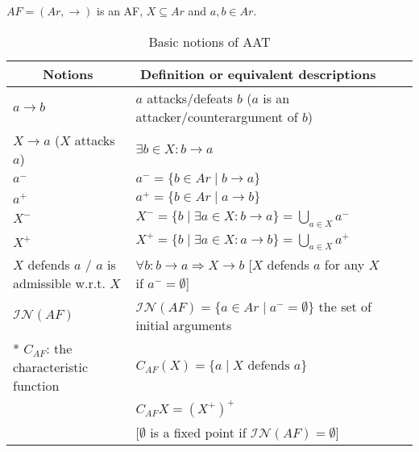 \begin{table}[ht!]
    \centering
    \caption{Basic notions of AAT}
    \label{tab: basic notions of AAT}
    $AF = (Ar,\to)$ is an AF, $X \subseteq Ar$ and $a,b \in Ar$.
    \vspace{1em}

    \renewcommand{\arraystretch}{1.3}
    \begin{tabular}{l||lll}
    \hline
    \multicolumn{1}{c}{Notions}  & 
    \multicolumn{1}{c}{Definition or equivalent descriptions} \\
    \hline

    $a \to b$   &
    $a$ attacks/defeats $b$ \hfill  ($a$ is an attacker/counterargument of $b$)   \\

    $X \to a$ \qquad  ($X$ attacks $a$) & 
    $\exists b \in X: b \to a$  \\

    
    
    $a^-$ &  
    $a^- = \{b \in Ar \mid b \to a\}$  \\

    $a^+$ &  
    $a^+ = \{b \in Ar \mid a \to b\}$  \\

    $X^-$ &  
    $X^- = \{b \mid \exists a \in X: b \to a\} = \bigcup_{a\in X} a^- $\\

    $X^+$ & 
    $X^+ = \{b \mid \exists a \in X: a \to b\} = \bigcup_{a\in X} a^+$ \\


    $X$ defends $a$  / $a$ is admissible w.r.t. $X$ & 
    $\forall b: b \to a \Rightarrow X \to b$ 
    \hfill
    [$X$ defends $a$ for any $X$ if $a^- = \emptyset$]  \\

    
    $\mathcal{IN}(AF)$  &
    $\mathcal{IN}(AF) = \{a\in Ar \mid a^- = \emptyset\}$  
    \hfill  the set of initial arguments   \\

    \hdashline

    \multirow{3}*{
    $C_{AF}$: the characteristic function}  
    & 
    $C_{AF} (X) = \{a \mid X \text{~defends~} a \}$   \\
    &  $C_{AF}{X} = (X^+)^+$  \\
    & [$\emptyset$ is a fixed point if $\mathcal{IN}(AF)=\emptyset$]  \\


\end{tabular}
\end{table}
